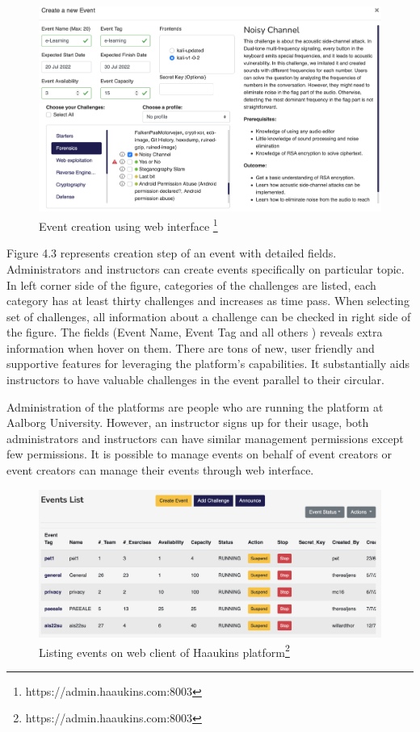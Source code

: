 \begin{figure}[htbp]
\centerline{\includegraphics[scale=.4]{figures/web-interface.png}}
\caption[Event creation using web interface]{Event creation using web interface \footnote{https://admin.haaukins.com:8003}}
\label{fig}
\end{figure}

Figure 4.3 represents creation step of an event with detailed fields. Administrators and instructors can create events specifically on particular topic. In left corner side of the figure, categories of the challenges are listed, each category has at least thirty challenges and increases as time pass. When selecting set of challenges, all information about a challenge can be checked in right side of the figure. The fields (Event Name, Event Tag and all others ) reveals extra information when hover on them. 
There are tons of new, user friendly and supportive features for leveraging the platform's capabilities. It substantially aids  instructors to have valuable challenges in the event parallel to their circular.

Administration of the platforms are people who are running the platform at Aalborg University. However, an instructor signs up for their usage, both administrators and instructors can have similar management permissions except few permissions.
It is possible to manage events on behalf of event creators or event creators can manage their events through web interface. 

\begin{figure}[htbp]
\centerline{\includegraphics[scale=.4]{figures/events_list.png}}
\caption[Listing events on web client of Haaukins platform ]{Listing events on web client of Haaukins platform\footnote{https://admin.haaukins.com:8003}}
\label{fig}
\end{figure} 

